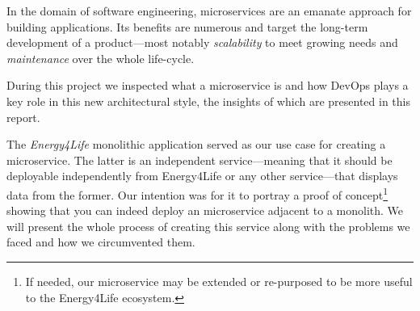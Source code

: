   

In the domain of software engineering, microservices are an emanate
approach for building applications. Its benefits are numerous and
target the long-term development of a product---most notably
\emph{scalability} to meet growing needs and \emph{maintenance} over the whole
life-cycle.

During this project we inspected what a microservice is and how DevOps
plays a key role in this new architectural style, the insights of
which are presented in this report.

The \emph{Energy4Life} monolithic application served as our use case
for creating a microservice. The latter is an independent
service---meaning that it should be deployable independently from
Energy4Life or any other service---that displays data from the former.
Our intention was for it to portray a proof of concept\footnote{If
needed, our microservice may be extended or re-purposed to be more
useful to the Energy4Life ecosystem.} showing that you can indeed deploy an
microservice adjacent to a monolith.  We will present the whole
process of creating this service along with the problems we faced and
how we circumvented them.
